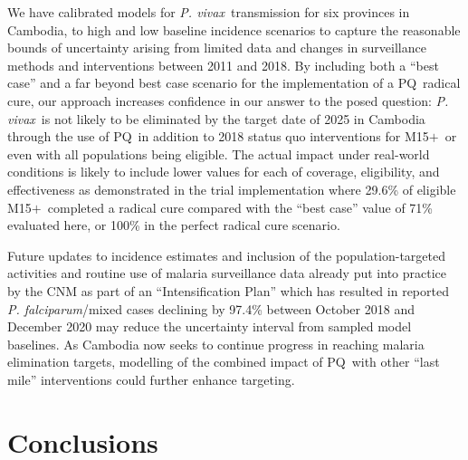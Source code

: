 \documentclass[doublespacing]{bmcart}
\newcommand{\pv}{\textit{P. vivax}}
\newcommand{\pf}{\textit{P. falciparum}}
\newcommand{\males}{M15$+$}
\newcommand{\pq}{PQ}
\begin{document}
We have calibrated models for \pv~transmission for six provinces in Cambodia, to high and low baseline incidence scenarios to capture the reasonable bounds of uncertainty arising from limited data and changes in surveillance methods and interventions between 2011 and 2018. By including both a ``best case'' and a far beyond best case scenario for the implementation of a \pq~radical cure, our approach increases confidence in our answer to the posed question: \pv~is not likely to be eliminated by the target date of 2025 in Cambodia through the use of \pq~in addition to 2018 status quo interventions for \males~or even with all populations being eligible. The actual impact under real-world conditions is likely to include lower values for each of coverage, eligibility, and effectiveness as demonstrated in the trial implementation \cite{brief_g6pdtests_2020} where 29.6\%  of eligible \males~completed a radical cure compared with the ``best case'' value of 71\% evaluated here, or 100\% in the perfect radical cure scenario.

Future updates to incidence estimates \cite{ngor2018} and inclusion of the population-targeted activities and routine use of malaria surveillance data already put into practice by the CNM as part of an ``Intensification Plan'' which has resulted in reported \pf/mixed cases declining by 97.4\% between October 2018 and December 2020 \cite{sovannaroth2022accelerating} may reduce the uncertainty interval from sampled model baselines. As Cambodia now seeks to continue progress in reaching malaria elimination targets, modelling of the combined impact of \pq~with other ``last mile'' interventions could further enhance targeting. 

\section*{Conclusions}
\end{document}
